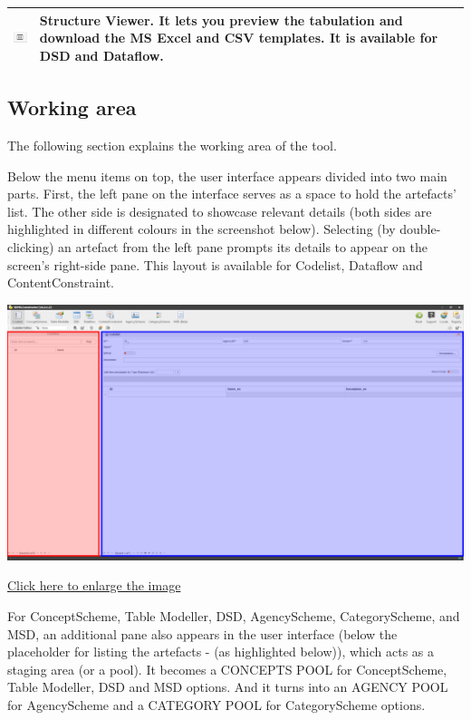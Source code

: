 \documentclass[
]{book}
\begin{document}
\begin{longtable}[]{@{}
  >{\raggedright\arraybackslash}p{}
  >{\raggedright\arraybackslash}p{}@{}}
\includegraphics{images/image039.png} & Structure Viewer. It lets you preview the tabulation and download the MS Excel and CSV templates. It is available for DSD and Dataflow. \\
\bottomrule()
\end{longtable}

\hypertarget{working-area}{%
\subsection{Working area}\label{working-area}}

The following section explains the working area of the tool.

Below the menu items on top, the user interface appears divided into two main parts. First, the left pane on the interface serves as a space to hold the artefacts' list. The other side is designated to showcase relevant details (both sides are highlighted in different colours in the screenshot below). Selecting (by double-clicking) an artefact from the left pane prompts its details to appear on the screen's right-side pane. This layout is available for Codelist, Dataflow and ContentConstraint.

\begin{center}\includegraphics[width=1\linewidth]{./images/image040} \end{center}

\href{images/image040.png}{Click here to enlarge the image}

For ConceptScheme, Table Modeller, DSD, AgencyScheme, CategoryScheme, and MSD, an additional pane also appears in the user interface (below the placeholder for listing the artefacts - (as highlighted below)), which acts as a staging area (or a pool). It becomes a CONCEPTS POOL for ConceptScheme, Table Modeller, DSD and MSD options. And it turns into an AGENCY POOL for AgencyScheme and a CATEGORY POOL for CategoryScheme options.
\end{document}
